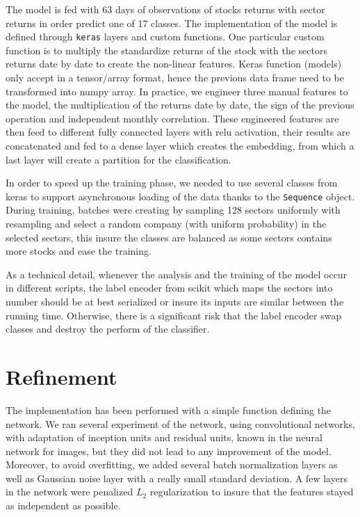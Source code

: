 \documentclass[a4paper,twoside]{article}
\begin{document}
The model is fed with 63 days of observations of stocks returns with sector
returns in order predict one of 17 classes. The implementation of the model
is defined through \texttt{keras} layers and custom functions. One particular custom
function is to multiply the standardize returns of the stock with the sectors
returns date by date to create the non-linear features. Keras function
(models) only accept in a tensor/array format, hence the previous data frame
need to be transformed into numpy array. In practice, we engineer three
manual features to the model, the multiplication of the returns date by date,
the sign of the previous operation and independent monthly correlation. These
engineered features are then feed to different fully connected layers with
relu activation, their results are concatenated and fed to a dense layer
which creates the embedding, from which a last layer will create a partition
for the classification. 

In order to speed up the training phase, we needed to use several classes
from keras to support asynchronous loading of the data thanks to the
\texttt{Sequence} object. During training, batches were creating by sampling 128
sectors uniformly with resampling and select a random company (with uniform
probability) in the selected sectors, this insure the classes are balanced as
some sectors contains more stocks and ease the training.

As a technical detail, whenever the analysis and the training of the model
occur in different scripts, the label encoder from scikit which maps the
sectors into number should be at best serialized or insure its inputs are
similar between the running time. Otherwise, there is a significant risk that
the label encoder swap classes and destroy the perform of the classifier.


\section{Refinement}
\label{sec:org73b2063}

The implementation has been performed with a simple function defining the
network. We ran several experiment of the network, using convolutional
networks, with adaptation of inception units and residual units, known in the
neural network for images, but they did not lead to any improvement of the
model. Moreover, to avoid overfitting, we added several batch normalization
layers as well as Gaussian noise layer with a really small standard deviation.
A few layers in the network were penalized \(L_2\) regularization to insure that
the features stayed as independent as possible.
\end{document}
